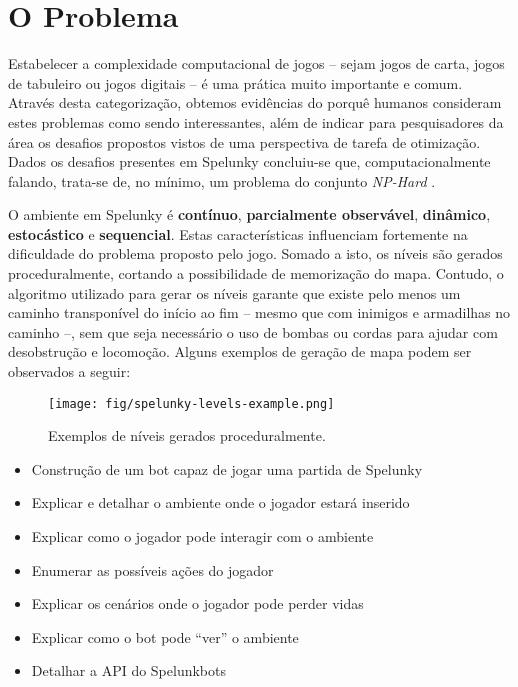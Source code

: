 \chapter{\label{chap:problem}O Problema}
Estabelecer a complexidade computacional de jogos -- sejam jogos de carta, jogos
de tabuleiro ou jogos digitais -- é uma prática muito importante e comum.
Através desta categorização, obtemos evidências do porquê humanos consideram
estes problemas como sendo interessantes, além de indicar para pesquisadores da
área os desafios propostos vistos de uma perspectiva de tarefa de otimização.
Dados os desafios presentes em Spelunky concluiu-se que, computacionalmente
falando, trata-se de, no mínimo, um problema do conjunto \textit{NP-Hard}
\cite{SPELUNKYHARD}.

O ambiente em Spelunky é \textbf{contínuo}, \textbf{parcialmente observável},
\textbf{dinâmico}, \textbf{estocástico} e \textbf{sequencial}. Estas
características influenciam fortemente na dificuldade do problema proposto pelo
jogo. Somado a isto, os níveis são gerados proceduralmente, cortando a
possibilidade de memorização do mapa. Contudo, o algoritmo utilizado para gerar
os níveis garante que existe pelo menos um caminho transponível do início ao fim
-- mesmo que com inimigos e armadilhas no caminho --, sem que seja necessário o
uso de bombas ou cordas para ajudar com desobstrução e locomoção. Alguns
exemplos de geração de mapa podem ser observados a seguir:

\begin{figure}[htb!]
\centering\texttt{[image: fig/spelunky-levels-example.png]}
\caption {\label{fig:spelunkbots-debug-screen}Exemplos de níveis gerados
proceduralmente.} \end{figure}


\begin{itemize}
    \item Construção de um bot capaz de jogar uma partida de Spelunky
    \item Explicar e detalhar o ambiente onde o jogador estará inserido
    \item Explicar como o jogador pode interagir com o ambiente
    \item Enumerar as possíveis ações do jogador
    \item Explicar os cenários onde o jogador pode perder vidas
    \item Explicar como o bot pode ``ver'' o ambiente
    \item Detalhar a API do Spelunkbots
\end{itemize}
